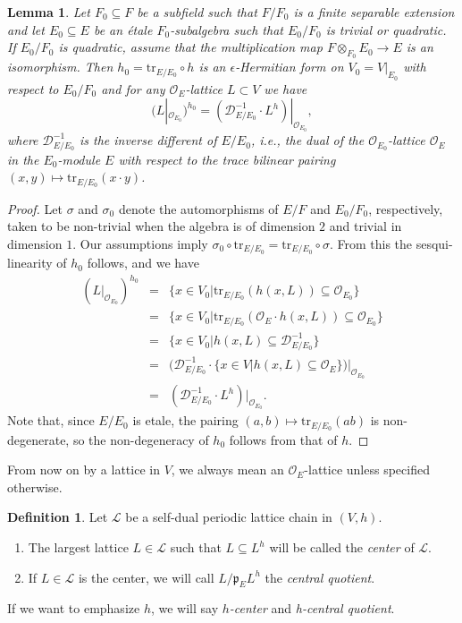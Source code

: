 \documentclass{article}
\def\mf#1{\mathfrak{#1}}
\def\mc#1{\mathcal{#1}}
\def\tx#1{\textrm{#1}}
\def\cO{\mathcal{O}}
\newtheorem{lem}[thm]{Lemma}
\theoremstyle{definition}
\newtheorem{dfn}[thm]{Definition}
\numberwithin{equation}{subsection}
\renewcommand{\-}{\hyp{}}
\begin{document}
\begin{lem} \label{lem:different-dual}
	Let $F_0 \subseteq F$ be a subfield such that $F/F_0$ is a finite separable extension and let $E_0 \subseteq E$ be an \'etale $F_0$-subalgebra such that $E_0/F_0$ is trivial or quadratic. If $E_0/F_0$ is quadratic, assume that the multiplication map $F \otimes_{F_0} E_0 \to E$ is an isomorphism. Then $h_0=\tx{tr}_{E/E_0}\circ h$ is an $\epsilon$-Hermitian form on $V_0=V|_{E_0}$ with respect to $E_0/F_0$ and for any $\cO_E$-lattice $L \subset V$ we have
	\[ (L|_{\cO_{E_0}})^{h_0} = (\mc{D}_{E/E_0}^{-1} \cdot L^h)|_{\cO_{E_0}}, \]
	where $\mc{D}_{E/E_0}^{-1}$ is the inverse different of $E/E_0$, i.e., the dual of the $\cO_{E_0}$-lattice $\cO_E$ in the $E_0$-module $E$ with respect to the trace bilinear pairing $(x,y) \mapsto \tx{tr}_{E/E_0}(x\cdot y)$.
\end{lem}
\begin{proof}
	Let $\sigma$ and $\sigma_0$ denote the automorphisms of $E/F$ and $E_0/F_0$, respectively, taken to be non-trivial when the algebra is of dimension $2$ and trivial in dimension $1$. Our assumptions imply $\sigma_0 \circ \tx{tr}_{E/E_0} = \tx{tr}_{E/E_0} \circ \sigma$. From this the sesqui-linearity of $h_0$ follows, and we have
	\begin{eqnarray*}
		(L|_{\cO_{E_0}})^{h_0}&=&\{x \in V_0|\tx{tr}_{E/E_0}(h(x,L)) \subseteq \cO_{E_0} \}\\
		&=&\{x \in V_0|\tx{tr}_{E/E_0}(\cO_E \cdot h(x,L)) \subseteq \cO_{E_0} \}\\
		&=&\{x \in V_0|h(x,L) \subseteq \mc{D}_{E/E_0}^{-1} \}\\
		&=&(\mc{D}_{E/E_0}^{-1} \cdot \{x \in V|h(x,L) \subseteq \cO_E \})|_{\cO_{E_0}}\\
		&=&(\mc{D}_{E/E_0}^{-1} \cdot L^h)|_{\cO_{E_0}}.
	\end{eqnarray*}
	Note that, since $E/E_0$ is etale, the pairing $(a,b) \mapsto \tx{tr}_{E/E_0}(ab)$ is non-degenerate, so the non-degeneracy of $h_0$ follows from that of $h$.
\end{proof}

From now on by a lattice in $V$, we always mean an $\cO_E$-lattice unless specified otherwise.

\begin{dfn}
	Let $\mc{L}$ be a self-dual periodic lattice chain in $(V,h)$.
	\begin{enumerate}
		\item The largest lattice $L \in \mc{L}$ such that $L \subseteq L^h$ will be called the \emph{center} 
of $\mc{L}$.
		\item If $L \in \mc{L}$ is the center, we will call  $L/\mf{p}_EL^h$ the \emph{central quotient}.
	\end{enumerate} 
	If we want to emphasize $h$, we will say \emph{$h$-center} and \emph{h-central quotient}.
\end{dfn}
\end{document}
